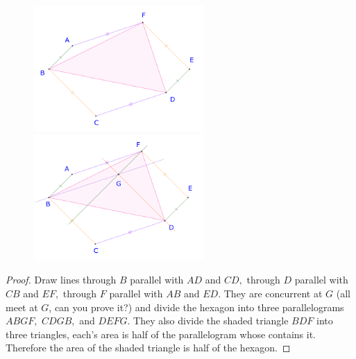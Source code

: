 \documentclass{article}
\begin{document}
\begin{figure}[h]
    \centering
    \begin{minipage}[t]{6.5cm}
        \begin{center}
            \includegraphics[width=6.5cm]{./svg/pdf/23-24-s3-i-p11.pdf}
        \end{center}
    \end{minipage}
    \qquad
    \begin{minipage}[t]{6.5cm}
        \centering
        \begin{center}
            \includegraphics[width=6.5cm]{./svg/pdf/23-24-s3-i-p11-s.pdf}
        \end{center}
    \end{minipage}
\end{figure}

\begin{proof}
    Draw lines through $B$ parallel with $AD$ and $CD,$ through $D$ parallel with $CB$ and $EF,$ through $F$ parallel with $AB$ and $ED.$
    They are concurrent at $G$ (all meet at $G$, can you prove it?) and divide the hexagon into three parallelograms $ABGF,$ $CDGB,$ and $DEFG.$
    They also divide the shaded triangle $BDF$ into three triangles, each's area is half of the parallelogram whose contains it.
    Therefore the area of the shaded triangle is half of the hexagon.
\end{proof}
\end{document}
